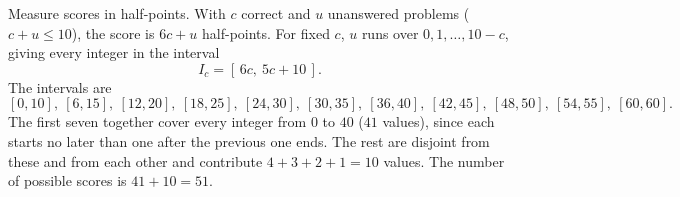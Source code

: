 Measure scores in half-points. With $c$ correct and $u$ unanswered problems ($c+u\le10$), the score is $6c+u$ half-points. For fixed $c$, $u$ runs over $0,1,\dots,10-c$, giving every integer in the interval
\[I_c=[\,6c,\ 5c+10\,].\]
The intervals are
\[[0,10],\ [6,15],\ [12,20],\ [18,25],\ [24,30],\ [30,35],\ [36,40],\ [42,45],\ [48,50],\ [54,55],\ [60,60].\]
The first seven together cover every integer from $0$ to $40$ ($41$ values), since each starts no later than one after the previous one ends. The rest are disjoint from these and from each other and contribute $4+3+2+1=10$ values. The number of possible scores is $41+10=\boxed{51}$.
